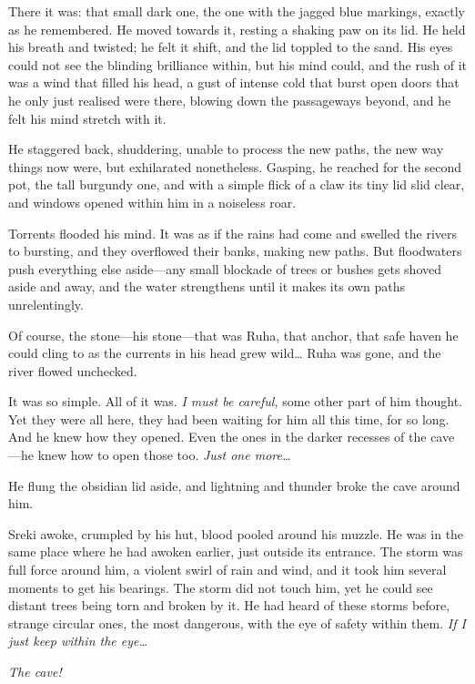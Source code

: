 There it was: that small dark one, the one with the jagged blue markings, exactly as he remembered. He moved towards it, resting a shaking paw on its lid. He held his breath and twisted; he felt it shift, and the lid toppled to the sand. His eyes could not see the blinding brilliance within, but his mind could, and the rush of it was a wind that filled his head, a gust of intense cold that burst open doors that he only just realised were there, blowing down the passageways beyond, and he felt his mind stretch with it.

He staggered back, shuddering, unable to process the new paths, the new way things now were, but exhilarated nonetheless. Gasping, he reached for the second pot, the tall burgundy one, and with a simple flick of a claw its tiny lid slid clear, and windows opened within him in a noiseless roar.

Torrents flooded his mind. It was as if the rains had come and swelled the rivers to bursting, and they overflowed their banks, making new paths. But floodwaters push everything else aside---any small blockade of trees or bushes gets shoved aside and away, and the water strengthens until it makes its own paths unrelentingly.

Of course, the stone---his stone---that was Ruha, that anchor, that safe haven he could cling to as the currents in his head grew wild\ldots{} Ruha was gone, and the river flowed unchecked.

It was so simple. All of it was. \emph{I must be careful,} some other part of him thought. Yet they were all here, they had been waiting for him all this time, for so long. And he knew how they opened. Even the ones in the darker recesses of the cave---he knew how to open those too. \emph{Just one more\ldots{}}

He flung the obsidian lid aside, and lightning and thunder broke the cave around him.

\secdiv

Sreki awoke, crumpled by his hut, blood pooled around his muzzle. He was in the same place where he had awoken earlier, just outside its entrance. The storm was full force around him, a violent swirl of rain and wind, and it took him several moments to get his bearings. The storm did not touch him, yet he could see distant trees being torn and broken by it. He had heard of these storms before, strange circular ones, the most dangerous, with the eye of safety within them. \emph{If I just keep within the eye\ldots{}}

\emph{The cave!}

